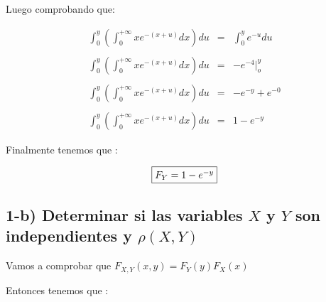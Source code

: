 \documentclass[12pt]{article}
\begin{document}
    Luego comprobando que:

    \begin{equation*}
        \begin{array}{rcl}
            \int_{0}^{y}\left(\int_{0}^{+\infty}xe^{-\left(x+u\right)}dx\right)du & = & \int_{0}^{y} e^{-u }du 
            \\
            \\
            \int_{0}^{y}\left(\int_{0}^{+\infty}xe^{-\left(x+u\right)}dx\right)du & = & -e^{-4}\vert_{o}^{y}
            \\
            \\
            \int_{0}^{y}\left(\int_{0}^{+\infty}xe^{-\left(x+u\right)}dx\right)du & = & -e^{-y}+e^{-0}
            \\
            \\
            \int_{0}^{y}\left(\int_{0}^{+\infty}xe^{-\left(x+u\right)}dx\right)du & = & 1 -e^{-y}
        \end{array}
    \end{equation*}

    Finalmente tenemos que :

    \begin{equation*}
        \fbox{$
        F_{Y}= 1 - e^{-y}
        $}
    \end{equation*}


    \subsection*{1-b) Determinar si las variables $X$ y $Y$ son independientes y $\rho \left(X,Y\right)$}
    
    \begin{flushleft}
        Vamos a comprobar que $F_{X,Y}\left(x,y\right) = F_Y\left(y\right) F_X\left(x\right)$
    \end{flushleft}

    \begin{flushleft}
        Entonces tenemos que : 
    \end{flushleft}
\end{document}
